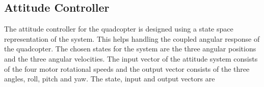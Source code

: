 \subsection{Attitude Controller}
The attitude controller for the quadcopter is designed using a state space representation of the system. This helps handling the coupled angular response of the quadcopter. The chosen states for the system are the three angular positions and the three angular velocities. The input vector of the attitude system consists of the four motor rotational speeds and the output vector consists of the three angles, roll, pitch and yaw. The state, input and output vectors are
%
%
%
%
